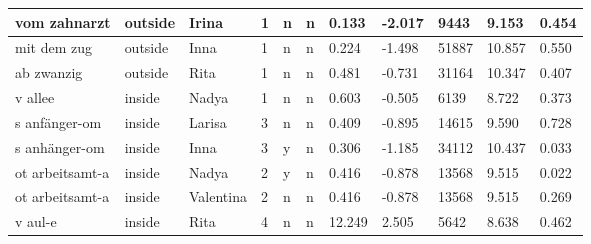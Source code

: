 \begin{longtable}{|p{4cm}|p{1cm}|p{1.2cm}|p{0.5cm}|p{0.5cm}|p{0.5cm}|R{1cm}|R{1cm}|R{1cm}|R{1cm}|R{1cm}|}
vom zahnarzt               & outside           & Irina         & 1                                   & n                          & n                          & 0.133      & -2.017        & 9443                    & 9.153                         & 0.454                   \\ \hline
mit dem zug                & outside           & Inna          & 1                                   & n                          & n                          & 0.224      & -1.498        & 51887                   & 10.857                        & 0.550                   \\ \hline
ab zwanzig                 & outside           & Rita          & 1                                   & n                          & n                          & 0.481      & -0.731        & 31164                   & 10.347                        & 0.407                   \\ \hline
v allee                    & inside            & Nadya         & 1                                   & n                          & n                          & 0.603      & -0.505        & 6139                    & 8.722                         & 0.373                   \\ \hline
s anf\"{a}nger-om           & inside            & Larisa        & 3                                   & n                          & n                          & 0.409      & -0.895        & 14615                   & 9.590                         & 0.728                   \\ \hline
s anh\"{a}nger-om          & inside            & Inna          & 3                                   & y                          & n                          & 0.306      & -1.185        & 34112                   & 10.437                        & 0.033                   \\ \hline
ot arbeitsamt-a            & inside            & Nadya         & 2                                   & y                          & n                          & 0.416      & -0.878        & 13568                   & 9.515                         & 0.022                   \\ \hline
ot arbeitsamt-a            & inside            & Valentina     & 2                                   & n                          & n                          & 0.416      & -0.878        & 13568                   & 9.515                         & 0.269                   \\ \hline
v aul-e                    & inside            & Rita          & 4                                   & n                          & n                          & 12.249     & 2.505         & 5642                    & 8.638                         & 0.462                   \\ \hline

\end{longtable}
